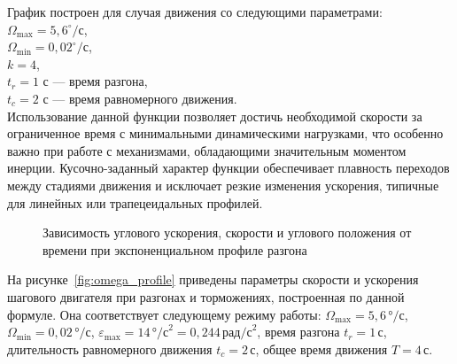 График построен для случая движения со следующими параметрами: \\
\quad $\Omega_{\max} = 5{,}6^\circ/\text{с}$, \\
\quad $\Omega_{\min} = 0{,}02^\circ/\text{с}$, \\
\quad $k = 4$, \\
\quad $t_r = 1$ с — время разгона, \\
\quad $t_c = 2$ с — время равномерного движения. \\

Использование данной функции позволяет достичь необходимой скорости за ограниченное время с минимальными динамическими нагрузками, что особенно важно при работе с механизмами, обладающими значительным моментом инерции. Кусочно-заданный характер функции обеспечивает плавность переходов между стадиями движения и исключает резкие изменения ускорения, типичные для линейных или трапецеидальных профилей.

\begin{figure}[ht]
	\caption{Зависимость углового ускорения, скорости и углового положения от времени при экспоненциальном профиле разгона}
	\label{fig:exp_profile}
\end{figure}

На рисунке~\ref{fig:omega_profile} приведены параметры скорости и ускорения шагового двигателя при разгонах и торможениях, построенная по данной формуле. Она соответствует следующему режиму работы: 
$\Omega_{\max} = 5{,}6 \, \text{°/с}$, 
$\Omega_{\min} = 0{,}02 \, \text{°/с}$, 
$\varepsilon_{\max} = 14 \, \text{°/с}^2 = 0{,}244 \, \text{рад/с}^2$, 
время разгона $t_r = 1 \, \text{с}$, 
длительность равномерного движения $t_c = 2 \, \text{с}$, 
общее время движения $T = 4 \, \text{с}$.



